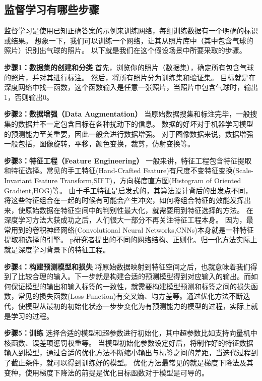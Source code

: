 \subsection{监督学习有哪些步骤}
\label{ux76d1ux7763ux5b66ux4e60ux6709ux54eaux4e9bux6b65ux9aa4}

监督学习是使用已知正确答案的示例来训练网络，每组训练数据有一个明确的标识或结果。
想象一下，我们可以训练一个网络，让其从照片库中（其中包含气球的照片）识别出气球的照片。
以下就是我们在这个假设场景中所要采取的步骤。

\textbf{步骤1：数据集的创建和分类} ​
首先，浏览你的照片（数据集），确定所有包含气球的照片，并对其进行标注。
然后，将所有照片分为训练集和验证集。
目标就是在深度网络中找一函数，这个函数输入是任意一张照片，当照片中包含气球时，输出1，否则输出0。

\textbf{步骤2：数据增强（Data Augmentation）} ​
当原始数据搜集和标注完毕，一般搜集的数据并不一定包含目标在各种扰动下的信息。
数据的好坏对于机器学习模型的预测能力至关重要，因此一般会进行数据增强。
对于图像数据来说，数据增强一般包括，图像旋转，平移，颜色变换，裁剪，仿射变换等。

\textbf{步骤3：特征工程（Feature Engineering）} ​
一般来讲，特征工程包含特征提取和特征选择。常见的手工特征(Hand-Crafted Feature)有尺度不变特征变换(Scale-Invariant Feature Transform,SIFT)，方向梯度直方图(Histogram of Oriented Gradient,HOG)等。
由于手工特征是启发式的，其算法设计背后的出发点不同，将这些特征组合在一起的时候有可能会产生冲突，如何将组合特征的效能发挥出来，使原始数据在特征空间中的判别性最大化，就需要用到特征选择的方法。
在深度学习方法大获成功之后，人们很大一部分不再关注特征工程本身。
因为，最常用到的卷积神经网络(Convolutional Neural Networks,CNNs)本身就是一种特征提取和选择的引擎。
p研究者提出的不同的网络结构、正则化、归一化方法实际上就是深度学习背景下的特征工程。

\textbf{步骤4：构建预测模型和损失} ​
将原始数据映射到特征空间之后，也就意味着我们得到了比较合理的输入。下一步就是构建合适的预测模型得到对应输入的输出。而如何保证模型的输出和输入标签的一致性，就需要构建模型预测和标签之间的损失函数，常见的损失函数(Loss
Function)有交叉熵、均方差等。通过优化方法不断迭代，使模型从最初的初始化状态一步步变化为有预测能力的模型的过程，实际上就是学习的过程。

\textbf{步骤5：训练} ​
选择合适的模型和超参数进行初始化，其中超参数比如支持向量机中核函数、误差项惩罚权重等。
当模型初始化参数设定好后，将制作好的特征数据输入到模型，通过合适的优化方法不断缩小输出与标签之间的差距，当迭代过程到了截止条件，就可以得到训练好的模型。
优化方法最常见的就是梯度下降法及其变种，使用梯度下降法的前提是优化目标函数对于模型是可导的。

